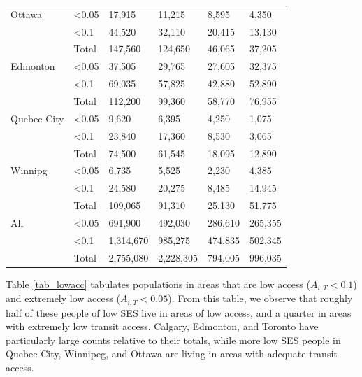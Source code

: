 \documentclass[11 pt, letterpaper]{article}
\begin{document}
{\begin{table}[H]
\begin{tabular}{ll|llll}
	Ottawa      & \textless 0.05 & 17,915    & 11,215    & 8,595    & 4,350   \\
	& \textless 0.1  & 44,520    & 32,110    & 20,415   & 13,130  \\
	& Total          & 147,560   & 124,650   & 46,065   & 37,205  \\ \hline
	Edmonton    & \textless 0.05 & 37,505    & 29,765    & 27,605   & 32,375  \\
	& \textless 0.1  & 69,035    & 57,825    & 42,880   & 52,890  \\
	& Total          & 112,200   & 99,360    & 58,770   & 76,955  \\ \hline
	Quebec City & \textless 0.05 & 9,620     & 6,395     & 4,250    & 1,075   \\
	& \textless 0.1  & 23,840    & 17,360    & 8,530    & 3,065   \\
	& Total          & 74,500    & 61,545    & 18,095   & 12,890  \\ \hline
	Winnipg     & \textless 0.05 & 6,735     & 5,525     & 2,230    & 4,385   \\
	& \textless 0.1  & 24,580    & 20,275    & 8,485    & 14,945  \\
	& Total          & 109,065   & 91,310    & 25,130   & 51,775  \\ \hline
	All         & \textless 0.05 & 691,900   & 492,030   & 286,610  & 265,355 \\
	& \textless 0.1  & 1,314,670 & 985,275   & 474,835  & 502,345 \\
	& Total          & 2,755,080 & 2,228,305 & 794,005  & 996,035
	\end{tabular}
\end{table}
\newpage

Table \ref{tab_lowacc} tabulates populations in areas that are low access ($A_{i,T} < 0.1$) and extremely low access ($A_{i,T} < 0.05$).  From this table, we observe that roughly half of these people of low SES live in areas of low access, and a quarter in areas with extremely low transit access. Calgary, Edmonton, and Toronto have particularly large counts relative to their totals, while more low SES people in Quebec City, Winnipeg, and Ottawa are living in areas with adequate transit access.

}
\end{document}
